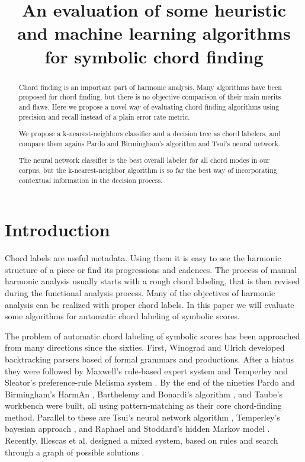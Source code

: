 \documentclass{article}
\title{An evaluation of some heuristic and machine learning algorithms for
  symbolic chord finding} \oneauthor {}{}
\begin{document}
\graphicspath{{figs/}{data/}}
\maketitle

\begin{abstract}

  Chord finding is an important part of harmonic analysis. Many
  algorithms have been proposed for chord finding, but there is no
  objective comparison of their main merits and flaws. Here we propose
  a novel way of evaluating chord finding algorithms using precision
  and recall instead of a plain error rate metric.
  
  We propose a k-nearest-neighbors classifier and a decision tree as
  chord labelers, and compare them agains Pardo and Birmingham's
  algorithm and Tsui's neural network.
  
  The neural network classifier is the best overall labeler for all
  chord modes in our corpus, but the k-nearest-neighbor algorithm is
  so far the best way of incorporating contextual information in the
  decision process.


\end{abstract}

\section{Introduction}
\label{sec:introduction}

Chord labels are useful metadata. Using them it is easy to see the
harmonic structure of a piece or find its progressions and
cadences. The process of manual harmonic analysis usually starts with
a rough chord labeling, that is then revised during the functional
analysis process. Many of the objectives of harmonic analysis can be
realized with proper chord labels. In this paper we will evaluate some
algorithms for automatic chord labeling of symbolic scores.

The problem of automatic chord labeling of symbolic scores has been
approached from many directions since the sixties. First, Winograd
\cite{winograd:linguistics} and Ulrich \cite{ulrich:analysis}
developed backtracking parsers based of formal grammars and
productions. After a hiatus they were followed by Maxwell's
\cite{maxwell:expert} rule-based expert system and Temperley and
Sleator's preference-rule Melisma system
\cite{temperley.ea:modeling}. By the end of the nineties Pardo and
Birmingham's HarmAn \cite{pardo.ea:algorithms}, Barthelemy and
Bonardi's algorithm \cite{barthelemy.ea:figured}, and Taube's
workbench \cite{taube:automatic} were built, all using
pattern-matching as their core chord-finding method. Parallel to these
are Tsui's neural network algorithm \cite{tsui:harmonic}, Temperley's
bayesian approach \cite{temperley:bayesian}, and Raphael and
Stoddard's hidden Markov model \cite{raphael.ea:harmonic}. Recently,
Illescas et al. designed a mixed system, based on rules and search
through a graph of possible solutions \cite{illescas.ea:harmonic}.
\end{document}
